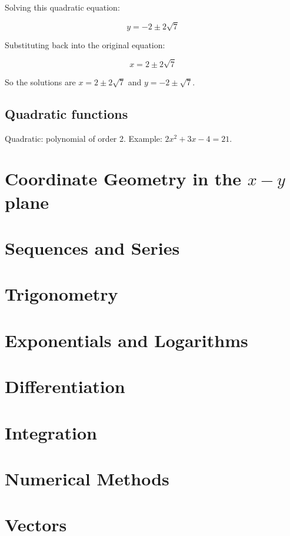 \documentclass[a4paper]{report}
\begin{document}
Solving this quadratic equation:

\[ y = -2 \pm 2\sqrt{7} \]

Substituting back into the original equation:

\[ x = 2 \pm 2\sqrt{7} \]

So the solutions are \( x = 2 \pm 2\sqrt{7} \) and \( y = -2 \pm \sqrt{7} \).

\section{Quadratic functions}

Quadratic: polynomial of order 2. Example: \( 2x^2 + 3x - 4 = 21 \).

\chapter{Coordinate Geometry in the \( x - y \) plane}

\chapter{Sequences and Series}

\chapter{Trigonometry}

\chapter{Exponentials and Logarithms}

\chapter{Differentiation}

\chapter{Integration}

\chapter{Numerical Methods}

\chapter{Vectors}
\end{document}
